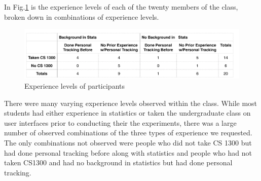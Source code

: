 In Fig.\ref{fig:table} is the experience levels of each of the twenty members of the class, broken down in combinations of experience levels. 

\begin{figure}[!t]\centering
\includegraphics[width=1.0\columnwidth]{images/Backgrounds_of_Students.PNG}
\caption{\footnotesize Experience levels of participants \label{fig:table} 
}%
\end{figure}

There were many varying experience levels observed within the class.  While most students had either experience in statistics or taken the undergraduate class on user interfaces prior to conducting their the experiments, there was a large number of observed combinations of the three types of experience we requested. The only combinations not observed were people who did not take CS 1300 but had done personal tracking before along with statistics and people who had not taken CS1300 and had no background in statistics but had done personal tracking.
